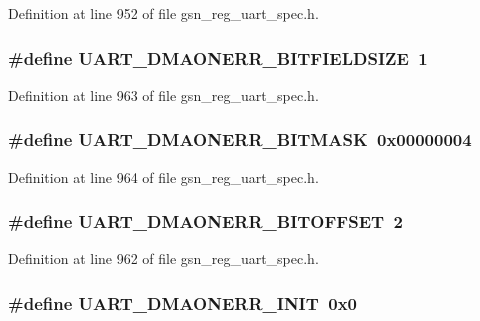 Definition at line 952 of file gsn\_\-reg\_\-uart\_\-spec.h.

\hypertarget{a00575_a39554a5bfe5d3f41c5fb35385c15f850}{
\subsubsection[{UART\_\-DMAONERR\_\-BITFIELDSIZE}]{\setlength{\rightskip}{0pt plus 5cm}\#define UART\_\-DMAONERR\_\-BITFIELDSIZE~1}}
\label{a00575_a39554a5bfe5d3f41c5fb35385c15f850}


Definition at line 963 of file gsn\_\-reg\_\-uart\_\-spec.h.

\hypertarget{a00575_a528b1da474f7b5f2e395a0edb047ca97}{
\subsubsection[{UART\_\-DMAONERR\_\-BITMASK}]{\setlength{\rightskip}{0pt plus 5cm}\#define UART\_\-DMAONERR\_\-BITMASK~0x00000004}}
\label{a00575_a528b1da474f7b5f2e395a0edb047ca97}


Definition at line 964 of file gsn\_\-reg\_\-uart\_\-spec.h.

\hypertarget{a00575_ad1bddbd805d0eb3b2608393efeaff62f}{
\subsubsection[{UART\_\-DMAONERR\_\-BITOFFSET}]{\setlength{\rightskip}{0pt plus 5cm}\#define UART\_\-DMAONERR\_\-BITOFFSET~2}}
\label{a00575_ad1bddbd805d0eb3b2608393efeaff62f}


Definition at line 962 of file gsn\_\-reg\_\-uart\_\-spec.h.

\hypertarget{a00575_a2c1d8823cc82445db71632edb897e5cd}{
\subsubsection[{UART\_\-DMAONERR\_\-INIT}]{\setlength{\rightskip}{0pt plus 5cm}\#define UART\_\-DMAONERR\_\-INIT~0x0}}
\label{a00575_a2c1d8823cc82445db71632edb897e5cd}


